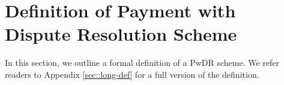 




\vspace{-2mm}
\section{ Definition of Payment with Dispute Resolution Scheme}\label{sec::def}

In this section, we outline a formal definition of a  PwDR scheme. We refer readers to Appendix \ref{sec::long-def} for a full version of the  definition. 
%
%
\vspace{-1mm}
